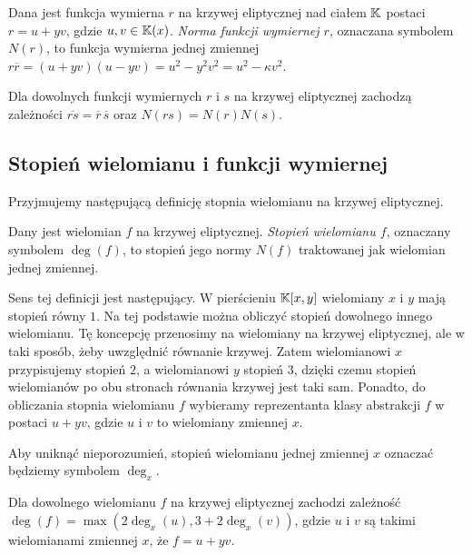 \begin{definition}
Dana jest funkcja wymierna $r$ na krzywej eliptycznej nad ciałem $\mathbb{K}$
postaci $r = u + yv$, gdzie $u, v \in \mathbb{K}(x)$.
\emph{Norma funkcji wymiernej $r$},
oznaczana symbolem $N(r)$,
to funkcja wymierna jednej zmiennej
$r\overline{r} = (u + yv)(u - yv) = u^2 - y^2v^2 = u^2 - \kappa v^2$.
\end{definition}

\begin{fact}
Dla dowolnych funkcji wymiernych $r$ i $s$ na krzywej eliptycznej
zachodzą zależności
$\overline{rs} = \overline{r}\,\overline{s}$
oraz $N(rs) = N(r)N(s)$.
\end{fact}

\subsection*{Stopień wielomianu i funkcji wymiernej}

\noindent
Przyjmujemy następującą definicję stopnia wielomianu na krzywej eliptycznej.

\begin{definition}
Dany jest wielomian $f$ na krzywej eliptycznej.
\emph{Stopień wielomianu $f$},
oznaczany symbolem $\deg(f)$,
to stopień jego normy $N(f)$ traktowanej jak wielomian jednej zmiennej.
\end{definition}

\noindent
Sens tej definicji jest następujący.
W pierścieniu $\mathbb{K}[x, y]$ wielomiany $x$ i $y$ mają stopień równy $1$.
Na tej podstawie można obliczyć stopień dowolnego innego wielomianu.
Tę koncepcję przenosimy na wielomiany na krzywej eliptycznej,
ale w taki sposób, żeby uwzględnić równanie krzywej.
Zatem wielomianowi $x$ przypisujemy stopień $2$,
a wielomianowi $y$ stopień $3$,
dzięki czemu stopień wielomianów po obu stronach równania krzywej jest taki sam.
Ponadto, do obliczania stopnia wielomianu $f$
wybieramy reprezentanta klasy abstrakcji $f$ w postaci $u + yv$,
gdzie $u$ i $v$ to wielomiany zmiennej $x$.

\begin{remark}
Aby uniknąć nieporozumień,
stopień wielomianu jednej zmiennej $x$
oznaczać będziemy symbolem $\deg_x$.
\end{remark}

\begin{fact}
Dla dowolnego wielomianu $f$ na krzywej eliptycznej
zachodzi zależność $\deg(f) = \max(2\deg_x(u), 3 + 2\deg_x(v))$,
gdzie $u$ i $v$ są takimi wielomianami zmiennej $x$, że $f = u + yv$.
\end{fact}

